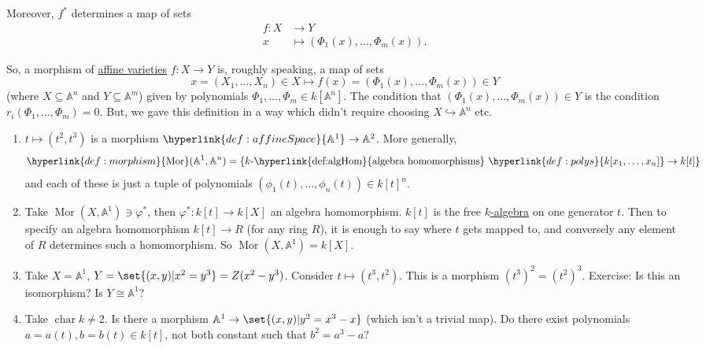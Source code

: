 \documentclass{article}
\newcommand{\A}{\mathbb{A}}
\DeclareMathOperator{\chara}{char}
\DeclareMathOperator{\Mor}{Mor}
\begin{document}
Moreover, $f^*$ determines a map of sets
\begin{align*}f:X &\longrightarrow Y \\ x &\longmapsto (\Phi_1(x), \dotsc, \Phi_m(x)).\end{align*}

So, a morphism of \hyperlink{def:affineVariety}{affine varieties} $f: X \to Y$ is, roughly speaking, a map of sets
\begin{equation*}x = (X_1, \dotsc, X_n) \in X \longmapsto f(x) = (\Phi_1(x), \dotsc, \Phi_m(x)) \in Y\end{equation*}
(where $X \subseteq \A^n$ and $Y \subseteq \A^m$) given by polynomials $\Phi_1, \dotsc, \Phi_m \in k[\A^n]$. The condition that $(\Phi_1(x), \dotsc, \Phi_m(x)) \in Y$ is the condition $r_i(\Phi_1, \dotsc, \Phi_m) = 0$.
But, we gave this definition in a way which didn't require choosing $X \hookrightarrow \A^n$ etc.

\begin{eg}\leavevmode
    \begin{enumerate}[label=(\roman*)]
        \item $t \mapsto (t^2, t^3)$ is a morphism $\hyperlink{def:affineSpace}{\A^1} \to \A^2$.
            More generally,
            \begin{equation*}
                \hyperlink{def:morphism}{\Mor}(\A^1, \A^n) = \{k \text{-\hyperlink{def:algHom}{algebra homomorphisms} } \hyperlink{def:polys}{k[x_1, \dotsc, x_n]} \to k[t]\}
            \end{equation*}
                and each of these is just a tuple of polynomials $(\phi_1(t), \dotsc, \phi_n(t)) \in k[t]^n$.
        \item Take $\Mor(X, \A^1) \ni \varphi^*$, then $\varphi^*: k[t] \to k[X]$ an algebra homomorphism.
            $k[t]$ is the free \hyperlink{def:kalg}{$k$-algebra} on one generator $t$.
            Then to specify an algebra homomorphism $k[t] \to R$ (for any ring $R$), it is enough to say where $t$ gets mapped to, and conversely any element of $R$ determines such a homomorphism.
            So $\Mor(X, \A^1) = k[X]$.
        \item Take $X = \A^1$, $Y = \set{(x, y) | x^2 = y^3} = Z(x^2 - y^3)$. Consider $t \mapsto (t^3, t^2)$. This is a morphism $(t^3)^2 = (t^2)^3$.
            Exercise: Is this an isomorphism? Is $Y \cong \A^1$?
        \item Take $\chara k \neq 2$. Is there a morphism $\A^1 \to \set{(x, y) | y^2 = x^3 - x}$ (which isn't a trivial map).
            Do there exist polynomials $a = a(t), b=b(t) \in k[t]$, not both constant such that $b^2 = a^3 - a$?
    \end{enumerate}
\end{eg}
\end{document}
